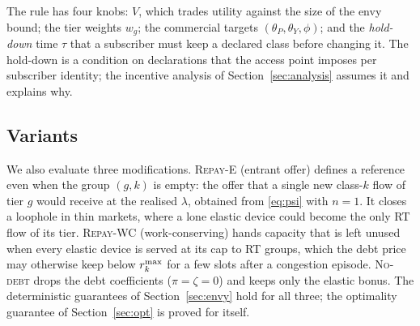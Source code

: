 The rule has four knobs: $V$, which trades utility against the size of the envy bound; the tier weights $w_g$; the commercial targets $(\theta_P,\theta_Y,\phi)$; and the \emph{hold-down} time $\tau$ that a subscriber must keep a declared class before changing it.
The hold-down is a condition on declarations that the access point imposes per subscriber identity; the incentive analysis of Section~\ref{sec:analysis} assumes it and explains why.

\subsection{Variants}\label{sec:variants}

We also evaluate three modifications.
\textsc{Repay-E} (entrant offer) defines a reference even when the group $(g,k)$ is empty: the offer that a single new class-$k$ flow of tier $g$ would receive at the realised $\lambda$, obtained from \eqref{eq:psi} with $n=1$. It closes a loophole in thin markets, where a lone elastic device could become the only RT flow of its tier.
\textsc{Repay-WC} (work-conserving) hands capacity that is left unused when every elastic device is served at its cap to RT groups, which the debt price may otherwise keep below $r^{\max}_k$ for a few slots after a congestion episode.
\textsc{No-debt} drops the debt coefficients ($\pi=\zeta=0$) and keeps only the elastic bonus.
The deterministic guarantees of Section~\ref{sec:envy} hold for all three; the optimality guarantee of Section~\ref{sec:opt} is proved for \repay{} itself.
